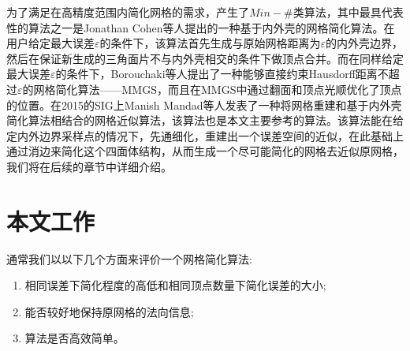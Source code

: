 为了满足在高精度范围内简化网格的需求，产生了$Min−\#$类算法，其中最具代表性的算法之一是Jonathan Cohen等人提出的一种基于内外壳的网格简化算法\cite{simp-envlop}。在用户给定最大误差$\varepsilon$的条件下，该算法首先生成与原始网格距离为$\varepsilon$的内外壳边界，然后在保证新生成的三角面片不与内外壳相交的条件下做顶点合并。而在同样给定最大误差$\varepsilon$的条件下，Borouchaki等人提出了一种能够直接约束Hausdorff距离不超过$\varepsilon$的网格简化算法——MMGS\cite{mmgs}，而且在MMGS中通过翻面和顶点光顺优化了顶点的位置。在2015的SIG上Manish Mandad等人发表了一种将网格重建和基于内外壳简化算法相结合的网格近似算法\cite{isotopic-appro}，该算法也是本文主要参考的算法。该算法能在给定内外边界采样点的情况下，先通细化，重建出一个误差空间的近似，在此基础上通过消边来简化这个四面体结构，从而生成一个尽可能简化的网格去近似原网格，我们将在后续的章节中详细介绍。
\section{本文工作}
通常我们以以下几个方面来评价一个网格简化算法:
\begin{enumerate}[（1）]
\item 相同误差下简化程度的高低和相同顶点数量下简化误差的大小;
\item 能否较好地保持原网格的法向信息;
\item 算法是否高效简单。
\end{enumerate}
